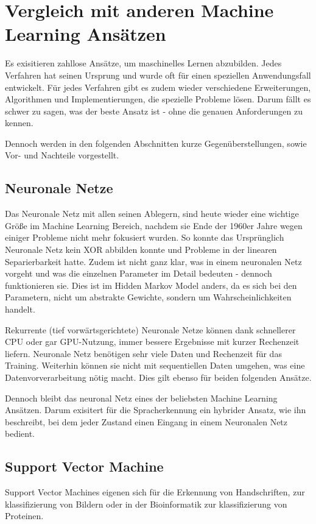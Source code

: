 \chapter{Vergleich mit anderen Machine Learning Ansätzen}  \label{mainsec:comp}
Es exisitieren zahllose Ansätze, um maschinelles Lernen abzubilden. Jedes Verfahren hat seinen Ursprung und wurde oft für einen speziellen Anwendungsfall entwickelt. Für jedes Verfahren gibt es zudem wieder verschiedene Erweiterungen, Algorithmen und Implementierungen, die spezielle Probleme lösen. Darum fällt es schwer zu sagen, was der beste Ansatz ist - ohne die genauen Anforderungen zu kennen.

Dennoch werden in den folgenden Abschnitten kurze Gegenüberstellungen, sowie Vor- und Nachteile vorgestellt.


\section{Neuronale Netze} \label{sec:neuron}
Das Neuronale Netz mit allen seinen Ablegern, sind heute wieder eine wichtige Größe im Machine Learning Bereich, nachdem sie Ende der 1960er Jahre wegen einiger Probleme nicht mehr fokusiert wurden. So konnte das Ursprünglich Neuronale Netz kein XOR abbilden konnte und Probleme in der linearen Separierbarkeit hatte. Zudem ist nicht ganz klar, was in einem  neuronalen Netz vorgeht und was die einzelnen Parameter im Detail bedeuten \cite[167]{marsland} - dennoch funktionieren sie. Dies ist im Hidden Markov Model anders, da es sich bei den Parametern, nicht um abstrakte Gewichte, sondern um Wahrscheinlichkeiten handelt.

Rekurrente (tief vorwärtsgerichtete) Neuronale Netze können dank schnellerer CPU oder gar GPU-Nutzung, immer bessere Ergebnisse mit kurzer Rechenzeit liefern. 
Neuronale Netz benötigen sehr viele Daten und Rechenzeit für das Training. Weiterhin können sie nicht mit sequentiellen Daten umgehen, was eine Datenvorverarbeitung nötig macht. Dies gilt ebenso für beiden folgenden Ansätze.

Dennoch bleibt das neuronal Netz eines der beliebsten Machine Learning Ansätzen. Darum exisitert für die Spracherkennung ein hybrider Ansatz, wie ihn \cite{hmmnn} beschreibt, bei dem jeder Zustand einen Eingang in einem Neuronalen Netz bedient.


\section{Support Vector Machine} \label{sec:svm}
Support Vector Machines eigenen sich für die Erkennung von Handschriften, zur klassifizierung von Bildern oder in der Bioinformatik zur klassifizierung von Proteinen.


